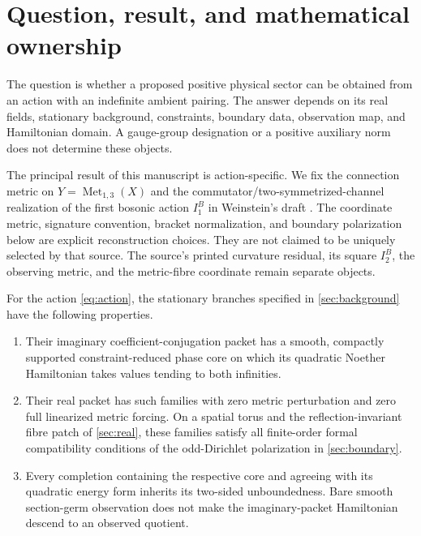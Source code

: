 \section{Question, result, and mathematical ownership}
\label{sec:scope}

The question is whether a proposed positive physical sector can be obtained
from an action with an indefinite ambient pairing. The answer depends on
its real fields, stationary background, constraints, boundary data,
observation map, and Hamiltonian domain. A gauge-group designation or a
positive auxiliary norm does not determine these objects.

The principal result of this manuscript is action-specific. We fix the
connection metric on $Y=\operatorname{Met}_{1,3}(X)$ and the
commutator/two-symmetrized-channel realization of the first bosonic action
$I_1^B$ in Weinstein's draft \cite{GU}. The coordinate metric, signature
convention, bracket normalization, and boundary polarization below are
explicit reconstruction choices. They are not claimed to be uniquely
selected by that source. The source's printed curvature residual, its
square $I_2^B$, the observing metric, and the metric-fibre coordinate remain
separate objects.

\begin{theorem}
\label{thm:main}
For the action \eqref{eq:action}, the stationary branches specified in
\cref{sec:background} have the following properties.
\begin{enumerate}
\item Their imaginary coefficient-conjugation packet has a smooth,
compactly supported constraint-reduced phase core on which its quadratic
Noether Hamiltonian takes values tending to both infinities.
\item Their real packet has such families with zero metric perturbation
and zero full linearized metric forcing. On a spatial torus and the
reflection-invariant fibre patch of \cref{sec:real}, these families satisfy
all finite-order formal compatibility conditions of the odd-Dirichlet
polarization in \cref{sec:boundary}.
\item Every completion containing the respective core and agreeing with
its quadratic energy form inherits its two-sided unboundedness. Bare
smooth section-germ observation does not make the imaginary-packet
Hamiltonian descend to an observed quotient.
\end{enumerate}
\end{theorem}

